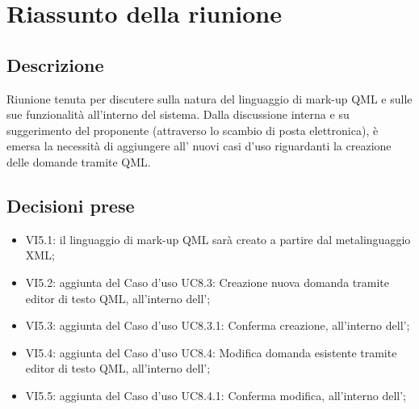 \section{Riassunto della riunione}
\subsection{Descrizione}

Riunione tenuta per discutere sulla natura del linguaggio di mark-up QML e sulle sue funzionalità all'interno del sistema.
Dalla discussione interna e su suggerimento del proponente (attraverso lo scambio di posta elettronica), è emersa la necessità di aggiungere all'\AdR {} nuovi casi d'uso riguardanti la creazione delle domande tramite QML.

\subsection{Decisioni prese}
\begin{itemize}
\item VI5.1: il linguaggio di mark-up QML sarà creato a partire dal metalinguaggio XML;
\item VI5.2: aggiunta del Caso d'uso UC8.3: Creazione nuova domanda tramite editor di testo QML, all'interno dell'\AdR;
\item VI5.3: aggiunta del Caso d'uso UC8.3.1: Conferma creazione, all'interno dell'\AdR;
\item VI5.4: aggiunta del Caso d'uso UC8.4: Modifica domanda esistente tramite editor di testo QML, all'interno dell'\AdR;
\item VI5.5: aggiunta del Caso d'uso UC8.4.1: Conferma modifica, all'interno dell'\AdR;
\end{itemize}
